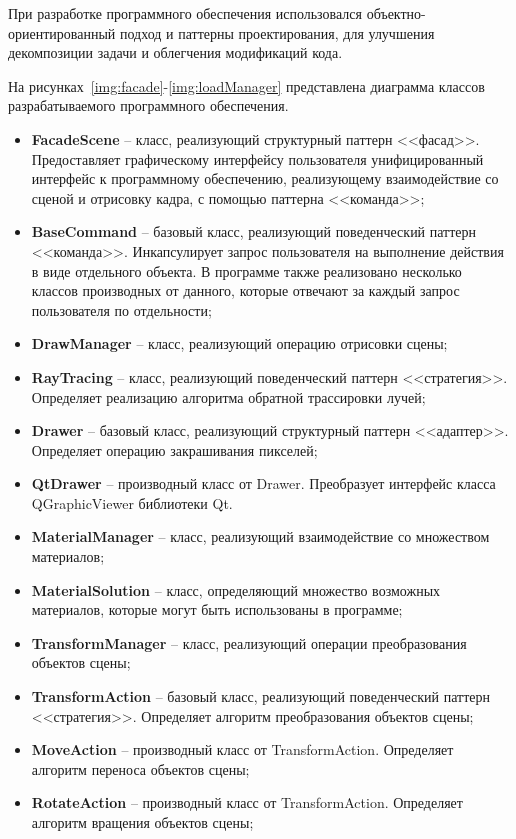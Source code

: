При разработке программного обеспечения использовался объектно-ориентированный подход и паттерны проектирования, для улучшения декомпозиции задачи и облегчения модификаций кода.

На рисунках~\ref{img:facade}-\ref{img:loadManager} представлена диаграмма классов разрабатываемого программного обеспечения.
\FloatBarrier
{}
\FloatBarrier

\begin{itemize}
	\item \textbf{FacadeScene} -- класс, реализующий структурный паттерн <<фасад>>. Предоставляет графическому интерфейсу пользователя унифицированный интерфейс к программному обеспечению, реализующему взаимодействие со сценой и отрисовку кадра, с помощью паттерна <<команда>>;
	\item \textbf{BaseCommand} -- базовый класс, реализующий поведенческий паттерн <<команда>>. Инкапсулирует запрос пользователя на выполнение действия в виде отдельного объекта. В программе также реализовано несколько классов производных от данного, которые отвечают за каждый запрос пользователя по отдельности;
	\item \textbf{DrawManager} -- класс, реализующий операцию отрисовки сцены;
	\item \textbf{RayTracing} -- класс, реализующий поведенческий паттерн <<стратегия>>. Определяет реализацию алгоритма обратной трассировки лучей;
	\item \textbf{Drawer} -- базовый класс, реализующий структурный паттерн <<адаптер>>. Определяет операцию закрашивания пикселей;
	\item \textbf{QtDrawer} -- производный класс от Drawer. Преобразует интерфейс класса QGraphicViewer библиотеки Qt.
	\item \textbf{MaterialManager} -- класс, реализующий взаимодействие со множеством материалов;
	\item \textbf{MaterialSolution} -- класс, определяющий множество возможных материалов, которые могут быть использованы в программе;
	\item \textbf{TransformManager} -- класс, реализующий операции преобразования объектов сцены;
	\item \textbf{TransformAction} -- базовый класс, реализующий поведенческий паттерн <<стратегия>>. Определяет алгоритм преобразования объектов сцены;
	\item \textbf{MoveAction} -- производный класс от TransformAction. Определяет алгоритм переноса объектов сцены;
	\item \textbf{RotateAction} -- производный класс от TransformAction. Определяет алгоритм вращения объектов сцены;
\end{itemize}

